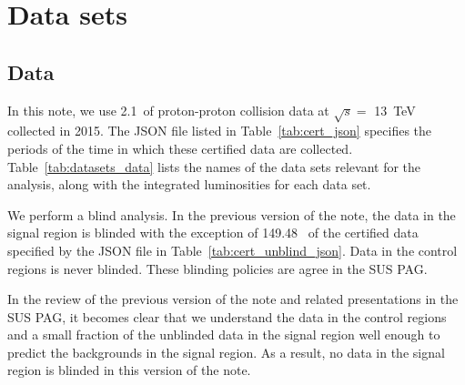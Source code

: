 \section{Data sets}
\label{sec:datasets}

\subsection{Data}


In this note, we use 2.1~\ifb of proton-proton collision data at
$\sqrt{s} =$ 13~TeV collected in 2015. The JSON file listed in
Table~\ref{tab:cert_json} specifies the periods of the time in which
these certified data are collected. Table~\ref{tab:datasets_data} lists
the names of the data sets relevant for the analysis, along with the
integrated luminosities for each data set.

We perform a blind analysis. In the previous version of the note, the
data in the signal region is blinded with the exception of 149.48~\ipb
of the certified data specified by the JSON file in
Table~\ref{tab:cert_unblind_json}. Data in the control regions is
never blinded. These blinding policies are agree in the SUS PAG.

In the review of the previous version of the note and related
presentations in the SUS PAG, it becomes clear that we understand the
data in the control regions and a small fraction of the unblinded data
in the signal region well enough to predict the backgrounds in the
signal region. As a result, no data in the signal region is blinded in
this version of the note.

\begin{table}[!h]
 \footnotesize
 \label{tab:cert_json}
\end{table}

\begin{table}[!h]
\footnotesize 
\label{tab:datasets_data}
\end{table}

\begin{table}[!h]
 \footnotesize

\label{tab:cert_unblind_json}
\end{table}

